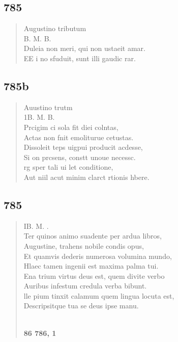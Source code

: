 \documentclass[11pt, a4paper]{report}
\begin{document}
            \subsection*{785}
      \begin{verse}
      Augustino tributum \\ B. M. B. \\ Duleia non meri, qui non ustaeit amar. \\ EE i no sfuduit, sunt illi gaudic rar. \\ 
      \end{verse}
  
            \subsection*{785b}
      \begin{verse}
      Auustino trutm \\ 1B. M. B. \\ Prcigim ci sola fit diei colntas, \\ Actas non fnit emoliturue cetustas. \\ Dissoleit teps uigpui producit acdesse, \\ Si on prcsens, constt unoue necessc. \\ rg sper tali ui let conditione, \\ Aut niil acut minim clarct rtionis hbere. \\ 
      \end{verse}
  
            \subsection*{785}
      \begin{verse}
      IB. M. . \\ Ter quinos animo suadente per ardua libros, \\ Augustine, trahens nobile condis opus, \\ Et quamvis dederis numerosa volumina mundo, \\ Hlaec tamen ingenii est maxima palma tui. \\ Ena trium virtus deus est, quem divite verbo \\ Auribus infestum credula verba bibunt. \\ lle pium tinxit calamum quem lingua locuta est, \\ Descripsitque tua se deus ipse manu. \\ 
        ﻿\pagebreak 
     \marginpar{[265]} \begin{center} \textbf{86 786, 1} \end{center}
      \end{verse}
  
\end{document}

